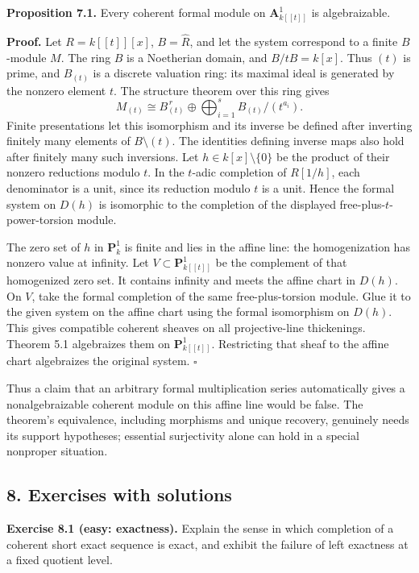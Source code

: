 \documentclass[11pt]{article}
\begin{document}
\textbf{Proposition 7.1.} Every coherent formal module on
\(\mathbf A^1_{k[[t]]}\) is algebraizable.

\textbf{Proof.} Let \(R=k[[t]][x]\), \(B=\widehat R\), and let the
system correspond to a finite \(B\)-module \(M\). The ring \(B\) is a
Noetherian domain, and \(B/tB=k[x]\). Thus \((t)\) is prime, and
\(B_{(t)}\) is a discrete valuation ring: its maximal ideal is generated
by the nonzero element \(t\). The structure theorem over this ring gives
\[
M_{(t)}\cong B_{(t)}^{\,r}\oplus\bigoplus_{i=1}^s B_{(t)}/(t^{a_i}).
\] Finite presentations let this isomorphism and its inverse be defined
after inverting finitely many elements of \(B\setminus(t)\). The
identities defining inverse maps also hold after finitely many such
inversions. Let \(h\in k[x]\setminus\{0\}\) be the product of their
nonzero reductions modulo \(t\). In the \(t\)-adic completion of
\(R[1/h]\), each denominator is a unit, since its reduction modulo \(t\)
is a unit. Hence the formal system on \(D(h)\) is isomorphic to the
completion of the displayed free-plus-\(t\)-power-torsion module.

The zero set of \(h\) in \(\mathbf P^1_k\) is finite and lies in the
affine line: the homogenization has nonzero value at infinity. Let
\(V\subset\mathbf P^1_{k[[t]]}\) be the complement of that homogenized
zero set. It contains infinity and meets the affine chart in \(D(h)\).
On \(V\), take the formal completion of the same free-plus-torsion
module. Glue it to the given system on the affine chart using the formal
isomorphism on \(D(h)\). This gives compatible coherent sheaves on all
projective-line thickenings. Theorem 5.1 algebraizes them on
\(\mathbf P^1_{k[[t]]}\). Restricting that sheaf to the affine chart
algebraizes the original system. \(\square\)

Thus a claim that an arbitrary formal multiplication series
automatically gives a nonalgebraizable coherent module on this affine
line would be false. The theorem's equivalence, including morphisms and
unique recovery, genuinely needs its support hypotheses; essential
surjectivity alone can hold in a special nonproper situation.

\subsection{8. Exercises with
solutions}\label{exercises-with-solutions-11}

\textbf{Exercise 8.1 (easy: exactness).} Explain the sense in which
completion of a coherent short exact sequence is exact, and exhibit the
failure of left exactness at a fixed quotient level.
\end{document}
